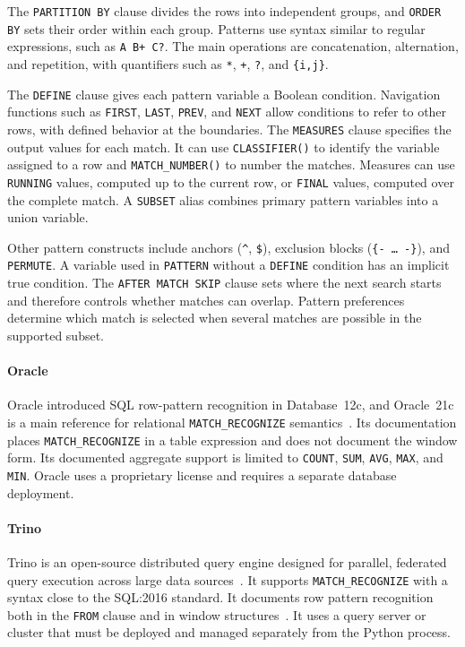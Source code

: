 \documentclass[preprint,12pt,times,a4paper]{elsarticle}
\begin{document}
The \texttt{PARTITION BY} clause divides the rows into independent groups, and
\texttt{ORDER BY} sets their order within each group. Patterns use syntax
similar to regular expressions, such as \texttt{A B+ C?}. The main operations
are concatenation, alternation, and repetition, with quantifiers such as
\texttt{*}, \texttt{+}, \texttt{?}, and \texttt{\{i,j\}}.

The \texttt{DEFINE} clause gives each pattern variable a Boolean condition.
Navigation functions such as \texttt{FIRST}, \texttt{LAST}, \texttt{PREV}, and
\texttt{NEXT} allow conditions to refer to other rows, with defined behavior at
the boundaries. The \texttt{MEASURES} clause specifies the output values for
each match. It can use \texttt{CLASSIFIER()} to identify the variable assigned
to a row and \texttt{MATCH\_NUMBER()} to number the matches. Measures can use
\texttt{RUNNING} values, computed up to the current row, or \texttt{FINAL}
values, computed over the complete match. A \texttt{SUBSET} alias combines
primary pattern variables into a union variable.

Other pattern constructs include anchors (\texttt{\^{}}, \texttt{\$}),
exclusion blocks (\texttt{\{-~\ldots~-\}}), and \texttt{PERMUTE}. A variable
used in \texttt{PATTERN} without a \texttt{DEFINE} condition has an implicit
true condition. The \texttt{AFTER MATCH SKIP} clause sets where the next search
starts and therefore controls whether matches can overlap. Pattern preferences
determine which match is selected when several matches are possible in the
supported subset.

\paragraph{Oracle}
Oracle introduced SQL row-pattern recognition in Database~12c, and Oracle~21c
is a main reference for relational \texttt{MATCH\_RECOGNIZE}
semantics~\cite{oracle2022,book}. Its documentation places
\texttt{MATCH\_RECOGNIZE} in a table expression and does not document the
window form. Its documented aggregate support is limited to
\texttt{COUNT}, \texttt{SUM}, \texttt{AVG}, \texttt{MAX},
and \texttt{MIN}. Oracle uses a proprietary license and requires a separate
database deployment.

\paragraph{Trino}
Trino is an open-source distributed query engine designed for parallel,
federated query execution across large data sources~\cite{trino2022,trino2021row}.
It supports \texttt{MATCH\_RECOGNIZE} with a syntax close to the SQL:2016
standard. It documents row pattern recognition both in the \texttt{FROM} clause
and in window structures~\cite{TrinoDocumentation}. It uses a query server or cluster that must be deployed
and managed separately from the Python process.
\end{document}

